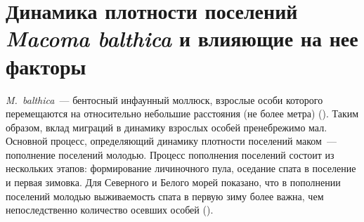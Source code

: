 
		\section{Динамика плотности поселений {\it Macoma balthica} и влияющие на нее факторы}


\textit{M.~balthica}~--- бентосный инфаунный моллюск, взрослые особи которого перемещаются на относительно небольшие расстояния (не более метра) (\cite{Beukema_et_al_1993}).
Таким образом, вклад миграций в динамику взрослых особей пренебрежимо мал.
Основной процесс, определяющий динамику плотности поселений маком~--- пополнение поселений молодью.
Процесс пополнения поселений состоит из нескольких этапов: формирование личиночного пула, оседание спата в поселение и первая зимовка.
Для Северного и Белого морей показано, что в пополнении поселений молодью выживаемость спата в первую зиму более важна, чем непоследственно количество осевших особей (\cite{Beukema_et_al_1998, Strasser_Gunter_2001, Maximovich_Gerasimova_2004}). 


